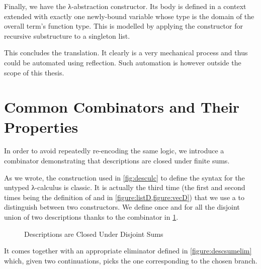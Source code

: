Finally, we have the λ-abstraction constructor. Its body is defined in
a context extended with exactly one newly-bound variable whose type is
the domain of the overall term's function type. This is modelled by
applying the constructor for recursive substructure to a singleton list.

\noindent\begin{minipage}[t]{0.4\textwidth}
\end{minipage}\begin{minipage}[t]{0.6\textwidth}
  \begin{AgdaSuppressSpace}
  \end{AgdaSuppressSpace}
\end{minipage}

This concludes the translation. It clearly is a very mechanical process
and thus could be automated using reflection. Such automation is however
outside the scope of this thesis.

\section{Common Combinators and Their Properties}
\label{desccomb}

In order to avoid repeatedly re-encoding the same logic, we introduce
a combinator demonstrating that descriptions are closed under finite
sums.

As we wrote, the construction used in \cref{fig:desculc} to define the
syntax for the untyped λ-calculus is classic. It is actually the third
time (the first and second times being the definition of  and
 in \cref{figure:listD,figure:vecD}) that we use a 
to distinguish between two constructors. We define once and for all
the disjoint union of two descriptions thanks to the  combinator
in \cref{figure:descsum}.

\begin{figure}[h]
  \caption{Descriptions are Closed Under Disjoint Sums\label{figure:descsum}}
\end{figure}

It comes together with an appropriate eliminator  defined in
\cref{figure:descsumelim} which, given two continuations, picks the one
corresponding to the chosen branch.

